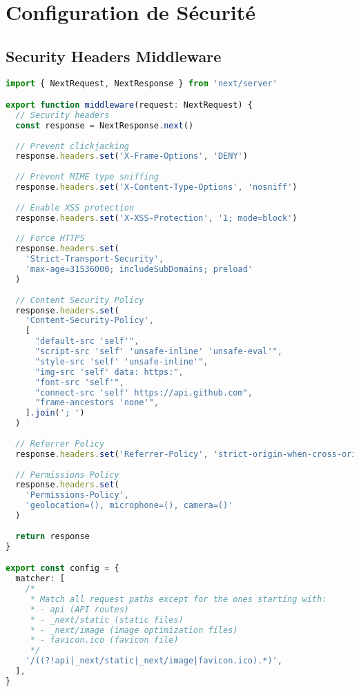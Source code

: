 \section{Configuration de Sécurité}

\subsection{Security Headers Middleware}

\begin{lstlisting}[language=TypeScript, caption=middleware.ts]
import { NextRequest, NextResponse } from 'next/server'

export function middleware(request: NextRequest) {
  // Security headers
  const response = NextResponse.next()
  
  // Prevent clickjacking
  response.headers.set('X-Frame-Options', 'DENY')
  
  // Prevent MIME type sniffing
  response.headers.set('X-Content-Type-Options', 'nosniff')
  
  // Enable XSS protection
  response.headers.set('X-XSS-Protection', '1; mode=block')
  
  // Force HTTPS
  response.headers.set(
    'Strict-Transport-Security',
    'max-age=31536000; includeSubDomains; preload'
  )
  
  // Content Security Policy
  response.headers.set(
    'Content-Security-Policy',
    [
      "default-src 'self'",
      "script-src 'self' 'unsafe-inline' 'unsafe-eval'",
      "style-src 'self' 'unsafe-inline'",
      "img-src 'self' data: https:",
      "font-src 'self'",
      "connect-src 'self' https://api.github.com",
      "frame-ancestors 'none'",
    ].join('; ')
  )
  
  // Referrer Policy
  response.headers.set('Referrer-Policy', 'strict-origin-when-cross-origin')
  
  // Permissions Policy
  response.headers.set(
    'Permissions-Policy',
    'geolocation=(), microphone=(), camera=()'
  )
  
  return response
}

export const config = {
  matcher: [
    /*
     * Match all request paths except for the ones starting with:
     * - api (API routes)
     * - _next/static (static files)
     * - _next/image (image optimization files)
     * - favicon.ico (favicon file)
     */
    '/((?!api|_next/static|_next/image|favicon.ico).*)',
  ],
}
\end{lstlisting} 